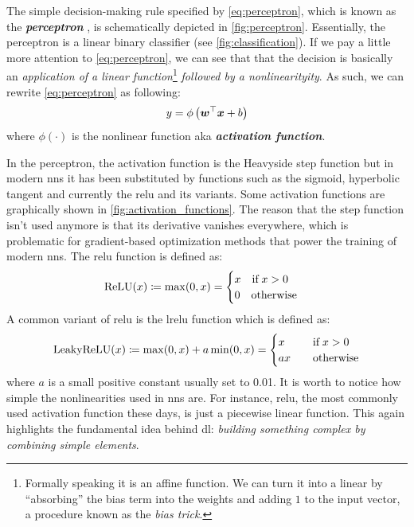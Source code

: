 The simple decision-making rule specified by \Equation{} \ref{eq:perceptron}, which
is known as the \emph{\textbf{perceptron}}
\parencite{Rosenblatt1957}, is schematically depicted in \Figure{}
\ref{fig:perceptron}. Essentially, the perceptron is a linear binary
classifier (see
\Figure{} \ref{fig:classification}). If we pay a little more attention to
\Equation{} \ref{eq:perceptron}, we can see that that the decision is basically
an \emph{application of a linear function}\footnote{Formally speaking it is an affine function.
We can turn it into a linear by ``absorbing'' the bias term into the weights and
adding $1$ to the input vector, a procedure known as the \emph{bias
trick}.} \emph{followed by a
nonlinearityity}. As such, we can rewrite \Equation{}
\ref{eq:perceptron} as following:
\begin{equation}
	\label{eq:neuron}
	y = \phi\left(\boldsymbol{w}^\top \boldsymbol{x} + b\right)
\end{equation}
where $\phi(\cdot)$ is the nonlinear function aka \emph{\textbf{activation
function}}.

In the perceptron, the activation function is the Heavyside step
function but in modern \glspl{nn} it has
been substituted by functions such as the sigmoid, hyperbolic
tangent and currently the \gls{relu}
and its variants. Some activation functions are graphically shown in \Figure{}
\ref{fig:activation_functions}. The reason that the step function isn't used
anymore is that its derivative vanishes everywhere, which is
problematic for gradient-based optimization methods  that power the training of modern \glspl{nn}. The \gls{relu}
function is defined as:
\begin{equation}
	\operatorname*{ReLU}(x) \coloneqq
	\max(0, x) =
	\begin{cases}
		x \quad \text{if}\; x > 0 \\
		0 \quad \text{otherwise}
	\end{cases}
\end{equation}
A common variant of \gls{relu} is the \gls{lrelu}
function which is defined as:
\begin{align}
	\operatorname*{LeakyReLU}(x) \coloneqq
	\max(0, x) + a\min(0, x)=
	\begin{cases}
		x \quad & \text{if}\; x > 0 \\
		ax \quad & \text{otherwise} \\
	\end{cases}
\end{align}
where $a$ is a small positive constant usually set to \num{0.01}. It is worth to
notice how simple the nonlinearities used in \glspl{nn} are. For instance,
\gls{relu}, the most commonly used activation function these days, is just a
piecewise linear function. This again
highlights the fundamental idea behind \gls{dl}: \emph{building something
complex by combining simple elements}.


